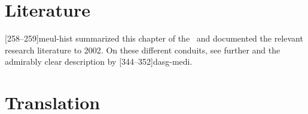 \section{Literature}

[258--259]{meul-hist} summarized this chapter of the \SS\
and documented the relevant research literature to 2002. On these
different conduits, see further
\cites[404--406]{wuja-2022}[xlvi--xlvii]{wuja-2003}[26--28]{ray-1980}[23--29 
and tables]{kutu-1962} and the admirably clear description by 
[344--352]{dasg-medi}.

\newpage

\section{Translation}

